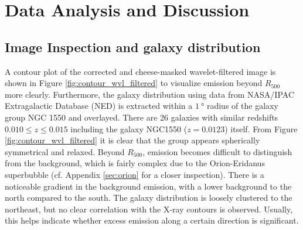 
\chapter{Data Analysis and Discussion}
\label{sec:data_analysis}
\section{Image Inspection and galaxy distribution}\label{sec:image_inspection}
%
A contour plot of the corrected and cheese-masked wavelet-filtered image is shown in Figure \ref{fig:contour_wvl_filtered} to visualize emission beyond \(R_{500}\) more clearly. Furthermore, the galaxy distribution using data from NASA/IPAC Extragalactic Database (NED) is extracted within a \(\SI{1}{\degree}\) radius of the galaxy group NGC 1550 and overlayed. There are 26 galaxies with similar redshifts \(0.010 \leq z \leq 0.015\) including the galaxy NGC1550 (\(z=0.0123\)) itself. From Figure \ref{fig:contour_wvl_filtered} it is clear that the group appears spherically symmetrical and relaxed. Beyond \(R_{500}\), emission becomes difficult to distinguish from the background, which is fairly complex due to the Orion-Eridanus superbubble (cf. Appendix \ref{sec:orion} for a closer inspection). There is a noticeable gradient in the background emission, with a lower background to the north compared to the south. The galaxy distribution is loosely clustered to the northeast, but no clear correlation with the X-ray contours is observed. Usually, this helps indicate whether excess emission along a certain direction is significant.

